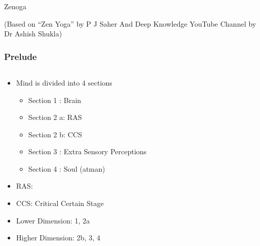 \begin{frame}[fragile]\frametitle{}
\begin{center}
{\Large Zenoga}


{\tiny (Based on ``Zen Yoga'' by P J Saher And Deep Knowledge YouTube Channel by Dr Ashish Shukla)}
\end{center}
\end{frame}


\begin{frame}[fragile]
\frametitle{Prelude}

\begin{columns}[T] %
\begin{column}{.48\textwidth}
\begin{itemize}
\item Mind is divided into 4 sections
	\begin{itemize}
	\item Section 1 : Brain
	\item Section 2 a: RAS
	\item Section 2 b: CCS
	\item Section 3 : Extra Sensory Perceptions
	\item Section 4 : Soul (atman)
	\end{itemize}
\item RAS:
\item CCS: Critical Certain Stage
\item Lower Dimension: 1, 2a
\item Higher Dimension: 2b, 3, 4
\end{itemize}
\end{column}%
\hfill%
\begin{column}{.48\textwidth}
 \begin{center}

\end{center}
\end{column}
\end{columns}
\end{frame}
